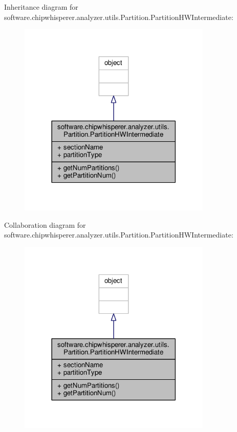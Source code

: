 Inheritance diagram for software.\+chipwhisperer.\+analyzer.\+utils.\+Partition.\+Partition\+H\+W\+Intermediate\+:\nopagebreak
\begin{figure}[H]
\begin{center}
\leavevmode
\includegraphics[width=261pt]{d2/d55/classsoftware_1_1chipwhisperer_1_1analyzer_1_1utils_1_1Partition_1_1PartitionHWIntermediate__inherit__graph}
\end{center}
\end{figure}


Collaboration diagram for software.\+chipwhisperer.\+analyzer.\+utils.\+Partition.\+Partition\+H\+W\+Intermediate\+:\nopagebreak
\begin{figure}[H]
\begin{center}
\leavevmode
\includegraphics[width=261pt]{d8/da5/classsoftware_1_1chipwhisperer_1_1analyzer_1_1utils_1_1Partition_1_1PartitionHWIntermediate__coll__graph}
\end{center}
\end{figure}



